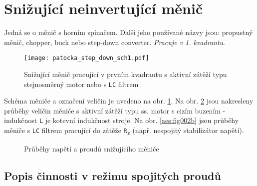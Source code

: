   \section{Snižující neinvertující měnič}\label{aes:sec002}
    Jedná se o měnič s horním spínačem. Další jeho používané názvy jsou: propustný měnič, chopper,
    buck nebo step-down converter. \emph{Pracuje v 1. kvadrantu}.
    \begin{figure}[ht!] %
      \centering
      \texttt{[image: patocka\_step\_down\_sch1.pdf]}
      \caption[Snižující měnič]{Snižující měnič pracující v prvním kvadrantu s aktivní zátěží
               typu stejnosměrný motor nebo s \texttt{LC} filtrem}
      \label{enz:fig_003}
    \end{figure}
    
    Schéma měniče a označení veličin je uvedeno na obr. \ref{enz:fig_003}. Na obr. 
    \ref{aes:fig002} jsou nakresleny průběhy veličin měniče s aktivní zátěží typu ss. motor s 
    cizím buzením - indukčnost \texttt{L} je kotevní indukčnost stroje. Na obr. \ref{aes:fig002b} 
    jsou průběhy měniče s \texttt{LC} filtrem pracující do zátěže \texttt{R\textsubscript{z}} 
    (např. nespojitý stabilizátor napětí).
  
    \begin{figure}[ht!]
      \centering
      \caption{Průběhy napětí a proudů snižujícího měniče}
      \label{aes:fig002}
    \end{figure}
    
    \subsection{Popis činnosti v \textbf{režimu spojitých proudů}}
    
